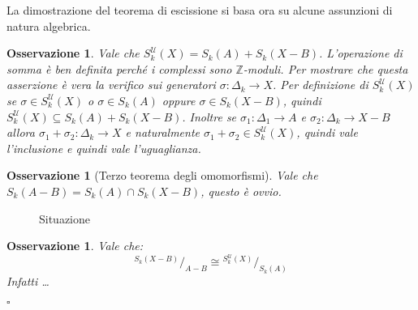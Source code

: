 \documentclass[10pt, twoside=false, x11names]{scrbook}
\newtheorem{osservation}[theorem]{Osservazione}
\newenvironment{proof}{{\textbf{Dimostrazione}:}}{\hfill $\square$}
\newcommand{\Z}{\mathbb{Z}}
\newcommand*\quot[2]{{^{\textstyle #1}\big/_{\textstyle #2}}}
\let\setminus-
\begin{document}
\begin{proof}
  La dimostrazione del teorema di escissione si basa ora su alcune assunzioni
  di natura algebrica.

  \begin{osservation}
    Vale che $ S_k^\mathcal{U}(X) = S_k(A) + S_k(X \setminus B) $. L'operazione di somma
    è ben definita perché i complessi sono $ \Z $-moduli. Per mostrare che
    questa asserzione è vera la verifico sui generatori
    $ \sigma \colon \Delta_k \to X $. Per definizione di $ S_k^\mathcal{U}(X) $ se
    $ \sigma \in S_k^\mathcal{U}(X) $ o $ \sigma \in S_k(A) $ oppure
    $ \sigma \in S_k(X\setminus B) $, quindi
    $ S_k^\mathcal{U}(X) \subseteq S_k(A) + S_k(X \setminus B) $. Inoltre se
    $ \sigma_1 \colon \Delta_1 \to A $ e
    $ \sigma_2 \colon \Delta_k \to X \setminus B $ allora
    $ \sigma_1 + \sigma_2 \colon \Delta_k \to X $ e naturalmente
    $ \sigma_1 + \sigma_2 \in S_k^\mathcal{U}(X) $, quindi vale l'inclusione e quindi vale
    l'uguaglianza.
  \end{osservation}

  \begin{osservation}[Terzo teorema degli omomorfismi]
    Vale che $ S_k(A \setminus B) = S_k(A) \cap S_k(X \setminus B) $, questo è ovvio.
  \end{osservation}

  \begin{figure}[htbp]
    \centering
    \caption{Situazione}
    \label{fig:lez14:excision_proof}
  \end{figure}

  \begin{osservation}
    Vale che:
    \[
      \quot{S_k(X \setminus B)}{A \setminus B} \cong \quot{S_k^\mathcal{U}(X)}{S_k(A)}
    \]
    Infatti \dots
  \end{osservation}


\end{proof}
\end{document}
